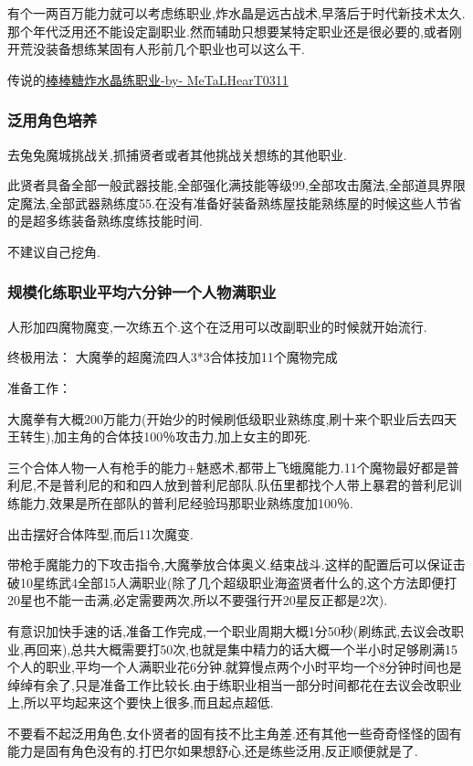 	有个一两百万能力就可以考虑练职业,炸水晶是远古战术,早落后于时代新技术太久.那个年代泛用还不能设定副职业.然而辅助只想要某特定职业还是很必要的,或者刚开荒没装备想练某固有人形前几个职业也可以这么干.

	传说的\href{http://tieba.baidu.com/p/3717431968}{棒棒糖炸水晶练职业-by- MeTaLHearT0311}

		\subsubsection{泛用角色培养}

		去兔兔魔城挑战关,抓捕贤者或者其他挑战关想练的其他职业.

		此贤者具备全部一般武器技能,全部强化满技能等级99,全部攻击魔法,全部道具界限定魔法,全部武器熟练度55.在没有准备好装备熟练屋技能熟练屋的时候这些人节省的是超多练装备熟练度练技能时间.

		不建议自己挖角.


		\subsubsection{规模化练职业平均六分钟一个人物满职业}

		人形加四魔物魔变,一次练五个.这个在泛用可以改副职业的时候就开始流行.

		终极用法：
		大魔拳的超魔流四人3*3合体技加11个魔物完成

		准备工作：

		大魔拳有大概200万能力(开始少的时候刷低级职业熟练度,刷十来个职业后去四天王转生),加主角的合体技100％攻击力,加上女主的即死.

		三个合体人物一人有枪手的能力+魅惑术,都带上飞蛾魔能力.11个魔物最好都是普利尼,不是普利尼的和和四人放到普利尼部队.队伍里都找个人带上暴君的普利尼训练能力,效果是所在部队的普利尼经验玛那职业熟练度加100％.

		出击摆好合体阵型,而后11次魔变.

		带枪手魔能力的下攻击指令,大魔拳放合体奥义.结束战斗.这样的配置后可以保证击破10星练武4全部15人满职业(除了几个超级职业海盗贤者什么的,这个方法即便打20星也不能一击满,必定需要两次,所以不要强行开20星反正都是2次).

		有意识加快手速的话,准备工作完成,一个职业周期大概1分50秒(刷练武,去议会改职业,再回来),总共大概需要打50次,也就是集中精力的话大概一个半小时足够刷满15个人的职业,平均一个人满职业花6分钟.就算慢点两个小时平均一个8分钟时间也是绰绰有余了,只是准备工作比较长.由于练职业相当一部分时间都花在去议会改职业上,所以平均起来这个要快上很多,而且起点超低.

		不要看不起泛用角色,女仆贤者的固有技不比主角差.还有其他一些奇奇怪怪的固有能力是固有角色没有的.打巴尔如果想舒心,还是练些泛用,反正顺便就是了.

